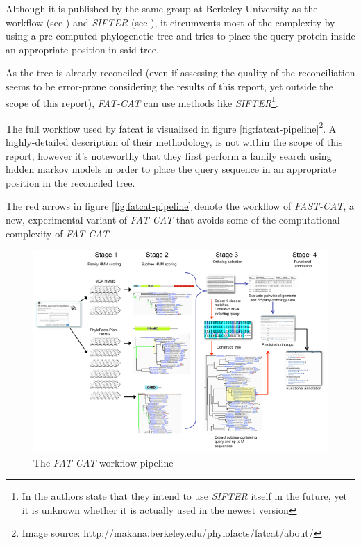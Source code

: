 \documentclass[pdftex,paper=A4,DIV=calc,titlepage,12pt]{scrartcl}
\newtheorem[L]{boxedDefinition}{Definition}
\begin{document}
Although it is published by the same group at Berkeley University as the workflow (see \cite{sjolander2004phylogenomic}) and \textit{SIFTER} (see \cite{engelhardt2005protein}), it circumvents most of the complexity by using a pre-computed phylogenetic tree and tries to place the query protein inside an appropriate position in said tree.

As the tree is already reconciled (even if assessing the quality of the reconciliation seems to be error-prone considering the results of this report, yet outside the scope of this report), \textit{FAT-CAT} can use methods like \textit{SIFTER}\footnote{In \cite{krishnamurthy2006phylofacts} the authors state that they intend to use \textit{SIFTER} itself in the future, yet it is unknown whether it is actually used in the newest version}.

The full workflow used by fatcat is visualized in figure \vref{fig:fatcat-pipeline}\footnote{Image source: http://makana.berkeley.edu/phylofacts/fatcat/about/}. A highly-detailed description of their methodology, is not within the scope of this report, however it's noteworthy that they first perform a family search using hidden markov models in order to place the query sequence in an appropriate position in the reconciled tree.

The red arrows in figure \vref{fig:fatcat-pipeline} denote the workflow of \textit{FAST-CAT}, a new, experimental variant of \textit{FAT-CAT} that avoids some of the computational complexity of \textit{FAT-CAT}.

\begin{figure}[ht!]
\centering
\includegraphics[width=\textwidth]{../Vortrag/figures/fatcat-pipeline.png}
\caption{The \textit{FAT-CAT} workflow pipeline}
\label{fig:fatcat-pipeline}
\end{figure}
\end{document}
